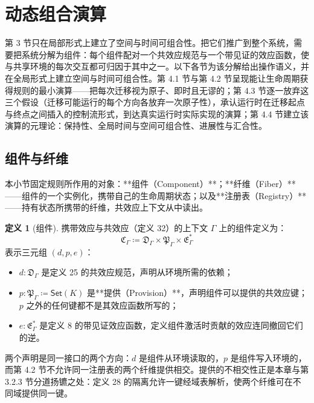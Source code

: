 \documentclass[11pt,a4paper]{article}
\theoremstyle{plain}
\theoremstyle{definition}
\newtheorem{definition}{定义}
\theoremstyle{remark}
\begin{document}
\section{动态组合演算}

第 3 节只在局部形式上建立了空间与时间可组合性。把它们推广到整个系统，需要把系统分解为组件：每个组件配对一个共效应规范与一个带见证的效应函数，使与共享环境的每次交互都可归因于其中之一。以下各节为该分解给出操作语义，并在全局形式上建立空间与时间可组合性。第 4.1 节与第 4.2 节呈现能让生命周期获得规则的最小演算——把每次迁移视为原子、即时且无谬的；第 4.3 节逐一放弃这三个假设（迁移可能运行的每个方向各放弃一次原子性），承认运行时在迁移起点与终点之间插入的控制流形式，到达真实运行时实际实现的演算；第 4.4 节建立该演算的元理论：保持性、全局时间与空间可组合性、进展性与汇合性。

\subsection{组件与纤维}

本小节固定规则所作用的对象：**组件（Component）**；**纤维（Fiber）**——组件的一个实例化，携带自己的生命周期状态；以及**注册表（Registry）**——持有状态所携带的纤维，共效应上下文从中读出。

\begin{definition}[组件]
携带效应与共效应（定义 32）的上下文 $\Gamma$ 上的组件定义为：
\[
\mathfrak{C}_\Gamma \coloneqq \mathfrak{D}_\Gamma \times \mathfrak{P}_\Gamma \times \mathfrak{E}_\Gamma^\ast \tag{37}
\]
表示三元组 $(d, p, e)$：
\begin{itemize}
\item $d : \mathfrak{D}_\Gamma$ 是定义 25 的共效应规范，声明从环境所需的依赖；
\item $p : \mathfrak{P}_\Gamma \coloneqq \mathsf{Set}(K)$ 是**提供（Provision）**，声明组件可以提供的共效应键；$p$ 之外的任何键都不是其效应函数所写的；
\item $e : \mathfrak{E}_\Gamma^\ast$ 是定义 8 的带见证效应函数，定义组件激活时贡献的效应连同撤回它们的逆。
\end{itemize}
\end{definition}

两个声明是同一接口的两个方向：$d$ 是组件从环境读取的，$p$ 是组件写入环境的，而第 4.2 节不允许同一注册表的两个纤维提供相交。提供的不相交性正是本章与第 3.2.3 节分道扬镳之处：定义 28 的隔离允许一键经域表解析，使两个纤维可在不同域提供同一键。
\end{document}
